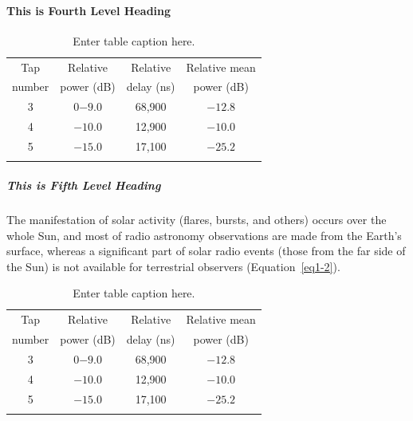 \paragraph{This is Fourth Level Heading}

\lipsum[5]

\begin{table}
\caption{Enter table caption here.\label{tab1-1}}{%
\begin{tabular}{@{}cccc@{}}
\toprule
Tap     &Relative   &Relative   &Relative mean\\
number  &power (dB) &delay (ns) &power (dB)\\
\midrule
3 &0$-9.0$  &68,900\footnotemark[1] &$-12.8$\\
4 &$-10.0$ &12,900\footnotemark[2] &$-10.0$\\
5 &$-15.0$ &17,100 &$-25.2$\\
\botrule
\end{tabular}}{
}

\end{table}

\subparagraph{This is Fifth Level Heading}

\lipsum[6]

The manifestation of solar activity (flares, bursts, and others) occurs over the whole Sun, and most of radio astronomy observations are made from the Earth's surface, whereas a significant part of solar radio events (those from the far side of the Sun) is not available for terrestrial observers (Equation~\ref{eq1-2}).

\begin{table}
\caption{Enter table caption here.\label{tab1-2}}{%
\begin{tabular}{@{}cccc@{}}
\toprule
Tap     &Relative   &Relative   &Relative mean\\
number  &power (dB) &delay (ns) &power (dB)\\
\midrule
3 &0$-9.0$  &68,900\footnotemark[1] &$-12.8$\\
4 &$-10.0$ &12,900\footnotemark[2] &$-10.0$\\
5 &$-15.0$ &17,100 &$-25.2$\\
\botrule
\end{tabular}}{
}
\end{table}

\egroup